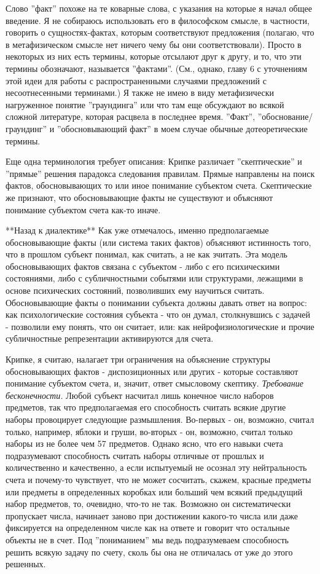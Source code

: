 \documentclass{book}
\begin{document}
Слово ''факт'' похоже на те коварные слова, с указания на которые я начал общее введение. Я не собираюсь использовать его в философском смысле, в частности, говорить о сущностях-фактах, которым соответствуют предложения (полагаю, что в метафизическом смысле нет ничего чему бы они соответствовали). Просто в некоторых из них есть термины, которые отсылают друг к другу, и то, что эти термины обозначают, называется ''фактами''. (См., однако, главу 6 с уточнениям этой идеи для работы с распространенными случаями предложений с несоотнесенными терминами.) Я также не имею в виду метафизически нагруженное понятие ''граундинга'' или что там еще обсуждают во всякой сложной литературе, которая расцвела в последнее время. ''Факт'', ''обоснование/граундинг'' и ''обосновывающий факт'' в моем случае обычные дотеоретические термины.

Еще одна терминология требует описания: Крипке различает ''скептические'' и ''прямые'' решения парадокса следования правилам. Прямые направлены на поиск фактов, обосновывающих то или иное понимание субъектом счета. Скептические же признают, что обосновывающие факты не существуют и объясняют понимание субъектом счета как-то иначе.

**Назад к диалектике** Как уже отмечалось, именно предполагаемые обосновывающие факты (или система таких фактов) объясняют истинность того, что в прошлом субъект понимал, как считать, а не как зчитать. Эта модель обосновывающих фактов связана с субъектом - либо с его психическими состояниями, либо с субличностными событями или структурами, лежащими в основе психических состояний, позволивших ему научиться считать. Обосновывающие факты о понимании субъекта должны давать ответ на вопрос: как психологические состояния субъекта - что он думал, столкнувшись с задачей - позволили ему понять, что он считает, или: как нейрофизиологические и прочие субличностные репрезентации активируются для счета.

Крипке, я считаю, налагает три ограничения на объяснение структуры обосновывающих фактов - диспозиционных или других - которые составляют понимание субъектом счета, и, значит, ответ смысловому скептику. \textit{Требование бесконечности.} Любой субъект насчитал лишь конечное число наборов предметов, так что предполагаемая его способность считать всякие другие наборы провоцирует следующие размышления. Во-первых - он, возможно, считал только, например, яблоки и груши, во-вторых - он, возможно, считал только наборы из не более чем 57 предметов. Однако ясно, что его навыки счета подразумевают способность считать наборы отличные от прошлых и количественно и качественно, а если испытуемый не осознал эту нейтральность счета и почему-то чувствует, что не может сосчитать, скажем, красные предметы или предметы в определенных коробках или больший чем всякий предыдущий набор предметов, то, очевидно, что-то не так. Возможно он систематически пропускает числа, начинает заново при достижении какого-то числа или даже фиксируется на определенном числе как на ответе и говорит что остальные объекты не в счет. Под ''пониманием'' мы ведь подразумеваем способность решить всякую задачу по счету, сколь бы она не отличалась от уже до этого решенных.
\end{document}
